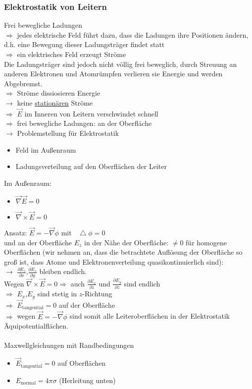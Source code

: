 \documentclass[a4paper]{article}
\newcommand*\laplace{\mathop{}\!\mathbin\bigtriangleup}
\begin{document}
\subsubsection{Elektrostatik von Leitern}
Frei bewegliche Ladungen\\
$\Rightarrow$ jedes elektrische Feld führt dazu, dass die Ladungen ihre
Positionen ändern, d.h. eine Bewegung dieser Ladungsträger findet statt\\
$\Rightarrow$ ein elektrisches Feld erzeugt Ströme \\
Die Ladungsträger sind jedoch nicht völlig frei beweglich, durch Streuung an
anderen Elektronen und Atomrümpfen verlieren sie Energie und werden
Abgebremst.\\
$\Rightarrow$ Ströme dissiosieren Energie\\
$\rightarrow$ keine \underline{stationären} Ströme\\
$\Rightarrow$ $\vec{E}$ im Inneren von Leitern verschwindet schnell\\
$\Rightarrow$ frei bewegliche Ladungen: an der Oberfläche\\
$\rightarrow$ Problemstellung für Elektrostatik
\begin{itemize}
  \item Feld im Außenraum
  \item Ladungsverteilung auf den Oberflächen der Leiter
\end{itemize}
Im Außenraum:
\begin{itemize}
  \item $\vec{\nabla}\vec{E}=0$
  \item $\vec{\nabla}\times\vec{E}=0$
\end{itemize} 
Ansatz: $\vec{E}=-\vec{\nabla}\phi$ mit $\laplace \phi=0$\\
und an der Oberfläche
$E_z$ in der Nähe der Oberfläche: $\neq0$
für homogene Oberflächen (wir nehmen an, dass die betrachtete Auflösung der
Oberfläche so groß ist, dass Atome und Elektronenverteilung quasikontinuierlich
sind):\\
$\rightarrow$ $\frac{\partial E_z}{\partial x}$,$\frac{\partial E_z}{\partial
y}$ bleiben endlich.\\
Wegen $\vec{\nabla}\times\vec{E}=0 \Rightarrow$ auch $\frac{\partial
E_x}{\partial z}$ und $\frac{\partial E_y}{\partial z}$ sind endlich\\
$\Rightarrow$ $E_x$,$E_y$ sind stetig in $z$-Richtung\\
$\Rightarrow$ $\vec{E}_{\text{tangential}}=0$ auf der Oberfläche\\
$\Rightarrow$ wegen $\vec{E}=-\vec{\nabla}\phi$ sind somit alle
Leiteroberflächen in der Elektrostatik Äquipotentialflächen.\\
 \\
Maxwellgleichungen mit Randbedingungen
\begin{itemize}
  \item $\vec{E}_{\text{tangential}}=0$ auf Oberflächen
  \item $E_{\text{normal}}=4\pi\sigma$ (Herleitung unten)
\end{itemize}
\end{document}
